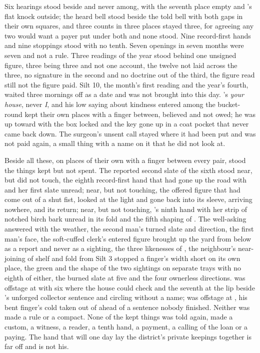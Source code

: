 Six hearings stood beside and never among, with the seventh place empty and 's flat knock outside; the heard bell stood beside the told bell with both gaps in their own squares, and three counts in three places stayed three, for agreeing any two would want a payer put under both and none stood. Nine record-first hands and nine stoppings stood with no tenth. Seven openings in seven months were seven and not a rule. Three readings of the year stood behind one unsigned figure, three being three and not one account, the twelve not laid across the three, no signature in the second and no doctrine out of the third, the figure read still not the figure paid. Silt 10, the month's first reading and the year's fourth, waited three mornings off as a date and was not brought into this day. 's \emph{your house}, never \emph{I}, and his low saying about kindness entered among the bucket-round kept their own places with a finger between, believed and not owed; he was up  toward  with the box locked and the key gone up in a coat pocket that never came back down. The surgeon's unsent call stayed where it had been put and was not paid again, a small thing with a name on it that he did not look at.

Beside all these, on places of their own with a finger between every pair, stood the things kept but not spent. The reported second slate of the sixth stood near, but did not touch, the eighth record-first hand that had gone up the road with  and her first slate unread; near, but not touching, the offered figure that had come out of a shut fist, looked at the light and gone back into its sleeve, arriving nowhere, and its return; near, but not touching, 's ninth hand with her strip of notched birch bark unread in its fold and the fifth shaping of . The well-asking answered with the weather, the second man's turned slate and direction, the first man's face, the soft-cuffed clerk's entered figure brought up the yard from  below  as a report and never as a sighting, the three likenesses of , the neighbour's near-joining of shelf and fold from Silt 3 stopped a finger's width short on its own place, the green and the shape of the two sightings on separate trays with no eighth of either, the burned slate at five and the four ownerless directions.  was offstage at  with six where the house could check and the seventh at the lip beside 's unforged collector sentence and  circling without a name;  was offstage at , his bent finger's cold taken out of  ahead of a sentence nobody finished. Neither was made a rule or a compact. None of the kept things was told again, made a custom, a witness, a reader, a tenth hand, a payment, a calling of the loan or a paying. The hand that will one day lay the district's private keepings together is far off and is not his.

